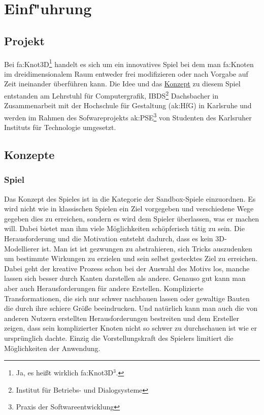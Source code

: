 %
%


\chapter{Einf{"u}hrung}
\label{EF}


\section{Projekt}

Bei \gls{fa:Knot3D}\footnote[3]{Ja, es heißt wirklich \gls{fa:Knot3D}$^3$.} handelt es sich um ein innovatives Spiel bei dem man \gls{fa:Knoten} im dreidimensionalem Raum entweder frei modifizieren oder nach Vorgabe auf Zeit ineinander überführen kann.
Die Idee und das \hyperlink{EF:Spielkonzept}{Konzept} zu diesem Spiel entstanden am Lehrstuhl für Computergrafik, IBDS\footnote{Institut für Betriebs- und Dialogsysteme} Dachsbacher in Zusammenarbeit mit der Hochschule für Gestaltung (\gls{ak:HfG}) in Karlsruhe und werden im Rahmen des Sofwareprojekts \gls{ak:PSE}\footnote{Praxis der Softwareentwicklung} von Studenten des Karlsruher Instituts für Technologie umgesetzt.


\section{Konzepte}
\label{EF:Konzepte}

\subsection{Spiel}
\label{EF:Spielkonzept}

Das Konzept des Spieles ist in die Kategorie der Sandbox-Spiele einzuordnen. Es wird nicht wie in klassischen Spielen ein Ziel vorgegeben und verschiedene Wege gegeben dies zu erreichen, sondern es wird dem Spieler überlassen, was er machen will. Dabei bietet man ihm viele Möglichkeiten schöpferisch tätig zu sein. Die Herausforderung und die Motivation entsteht dadurch, dass es kein 3D-Modellierer ist. Man ist ist gezwungen zu abstrahieren, sich Tricks auszudenken um bestimmte Wirkungen zu erzielen und sein selbst gestecktes Ziel zu erreichen. Dabei geht der kreative Prozess schon bei der Auswahl des Motivs los, manche lassen sich besser durch Kanten darstellen als andere.
Genauso gut kann man aber auch Herausforderungen für andere Erstellen. Komplizierte Transformationen, die sich nur schwer nachbauen lassen oder gewaltige Bauten die durch ihre schiere Größe beeindrucken. Und natürlich kann man auch die von anderen Nutzern erstellten Herausforderungen bestreiten und dem Ersteller zeigen, dass sein komplizierter Knoten nicht so schwer zu durchschauen ist wie er ursprünglich dachte.
Einzig die Vorstellungskraft des Spielers limitiert die Möglichkeiten der Anwendung.


